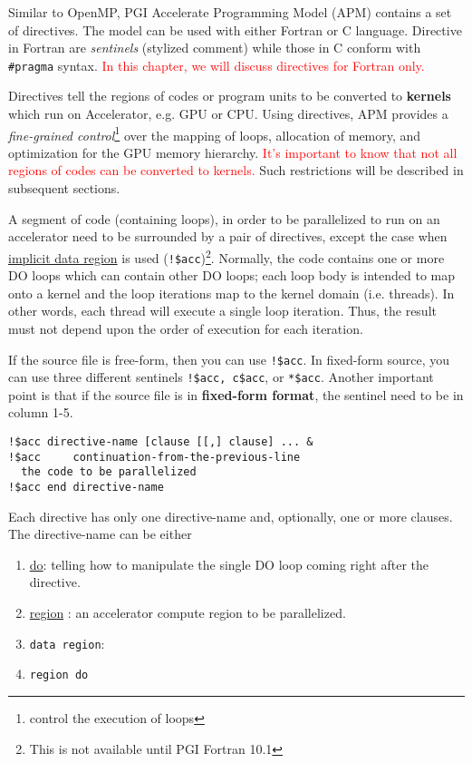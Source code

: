 Similar to OpenMP, PGI Accelerate Programming Model (APM) contains a
set of directives. The model can be used with either Fortran or C
language. Directive in Fortran are {\it sentinels} (stylized comment)
while those in C conform with \verb!#pragma!  syntax.
\textcolor{red}{In this chapter, we will discuss directives for Fortran
  only.}

Directives tell the regions of codes or program units to be converted
to {\bf kernels} which run on Accelerator, e.g. GPU or CPU. Using
directives, APM provides a {\it fine-grained
  control}\footnote{control
  the execution of loops}
over the mapping of loops, allocation of memory, and optimization for
the GPU memory hierarchy.
\textcolor{red}{It's important to know that not all regions of codes
  can be converted to kernels.}
Such restrictions will be described in subsequent sections.

A segment of code (containing loops), in order to be parallelized to
run on an accelerator need to be surrounded by a pair of directives,
except the case when
\hyperref[sec:define-decl-data]{implicit data region} is used
(\verb.!$acc.)\footnote{This is not available until PGI Fortran 10.1}.
Normally, the code contains one or more DO loops which can contain
other DO loops; each loop body is intended to map onto a kernel and
the loop iterations map to the kernel domain (i.e. threads). In other
words, each thread will execute a single loop iteration. Thus, the
result must not depend upon the order of execution for each iteration.

If the source file is free-form, then you can use \verb.!$acc.. In
fixed-form source, you can use three different sentinels
\verb.!$acc, c$acc., or \verb!*$acc!.  Another important point is that
if the source file is in {\bf fixed-form format}, the sentinel need to
be in column 1-5.

\begin{verbatim}
!$acc directive-name [clause [[,] clause] ... &
!$acc     continuation-from-the-previous-line
  the code to be parallelized
!$acc end directive-name
\end{verbatim}
Each directive has only one directive-name and, optionally, one or
more clauses. The directive-name can be either

\begin{enumerate}
\item \hyperref[sec:do-loop-mapping]{do}: telling how to manipulate
  the single DO loop coming right after the directive. 
\item \hyperref[sec:define-region]{region} : an accelerator compute
  region to be parallelized.
\item \verb!data region!: 
\item \verb!region do!
\end{enumerate}

